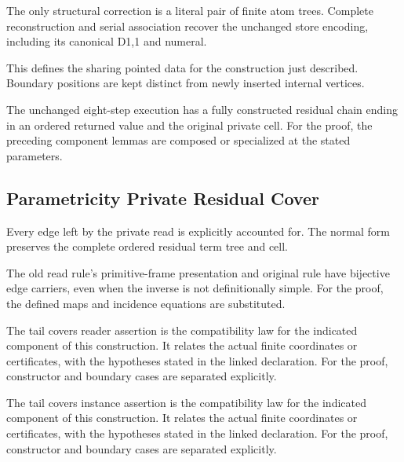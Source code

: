 The only structural correction is a literal pair of finite atom trees. Complete reconstruction and serial association recover the unchanged store encoding, including its canonical D1,1 and numeral.
\par{}

This defines the sharing pointed data for the construction just described. Boundary positions are kept distinct from newly inserted internal vertices.
\par{}

The unchanged eight-step execution has a fully constructed residual chain ending in an ordered returned value and the original private cell.
For the proof, the preceding component lemmas are composed or specialized at the stated parameters.
\par{}

\subsection{Parametricity Private Residual Cover}
Every edge left by the private read is explicitly accounted for. The normal form preserves the complete ordered residual term tree and cell.

The old read rule's primitive-frame presentation and original rule have bijective edge carriers, even when the inverse is not definitionally simple.
For the proof, the defined maps and incidence equations are substituted.
\par{}

The tail covers reader assertion is the compatibility law for the indicated component of this construction. It relates the actual finite coordinates or certificates, with the hypotheses stated in the linked declaration.
For the proof, constructor and boundary cases are separated explicitly.
\par{}

The tail covers instance assertion is the compatibility law for the indicated component of this construction. It relates the actual finite coordinates or certificates, with the hypotheses stated in the linked declaration.
For the proof, constructor and boundary cases are separated explicitly.
\par{}

